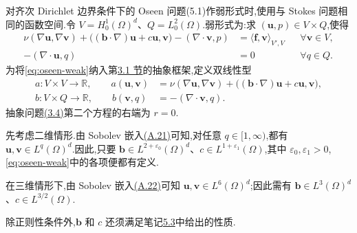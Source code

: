 \begin{note}\label{note:oseen-weak-form}
对齐次 Dirichlet 边界条件下的 Oseen 问题(5.1)作弱形式时,使用与 Stokes 问题相同的函数空间.令 $V=H_0^1(\Omega)^d$、$Q=L_0^2(\Omega)$.弱形式为:求 $(\bm{u},p)\in V\times Q$,使得
\begin{equation}\label{eq:oseen-weak}
\begin{aligned}
  \nu(\nabla\bm{u},\nabla\bm{v})
  +\bigl((\bm{b}\cdot\nabla)\bm{u}+c\bm{u},\bm{v}\bigr)
  -(\nabla\cdot\bm{v},p)
    &=\langle\bm{f},\bm{v}\rangle_{V',V}
      &&\forall\bm{v}\in V,\\
  -(\nabla\cdot\bm{u},q)&=0
      &&\forall q\in Q.
\end{aligned}
\end{equation}
为将\cref{eq:oseen-weak}纳入第\hyperref[sec:abstract-saddle-point]{3.1 节}的抽象框架,定义双线性型
\begin{equation}\label{eq:oseen-bilinear-forms}
\begin{aligned}
  a:V\times V\to\mathbb{R},\qquad
  a(\bm{u},\bm{v})
    &=\nu(\nabla\bm{u},\nabla\bm{v})
      +\bigl((\bm{b}\cdot\nabla)\bm{u}+c\bm{u},\bm{v}\bigr),\\
  b:V\times Q\to\mathbb{R},\qquad
  b(\bm{v},q)&=-(\nabla\cdot\bm{v},q).
\end{aligned}
\end{equation}
抽象问题\hyperref[eq:abstract-saddle-point-system]{(3.4)}第二个方程的右端为 $r=0$.
\end{note}

\begin{note}\label{note:oseen-minimal-regularity}
先考虑二维情形.由 Sobolev 嵌入\hyperref[eq:appendix-a-21]{(A.21)}可知,对任意 $q\in[1,\infty)$,都有 $\bm{u},\bm{v}\in L^q(\Omega)^d$.因此,只要 $\bm{b}\in L^{2+\varepsilon_0}(\Omega)^d$、$c\in L^{1+\varepsilon_1}(\Omega)$,其中 $\varepsilon_0,\varepsilon_1>0$,\cref{eq:oseen-weak}中的各项便都有定义.

在三维情形下,由 Sobolev 嵌入\hyperref[eq:appendix-a-22]{(A.22)}可知 $\bm{u},\bm{v}\in L^6(\Omega)^d$;因此需有 $\bm{b}\in L^3(\Omega)^d$、$c\in L^{3/2}(\Omega)$.

除正则性条件外,$\bm{b}$ 和 $c$ 还须满足笔记\hyperref[note:oseen-coefficients]{5.3}中给出的性质.
\end{note}

